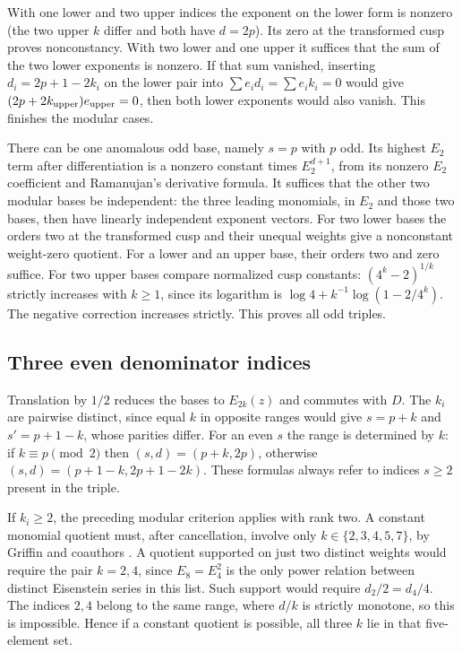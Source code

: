 \documentclass[11pt]{article}
\begin{document}
With one lower and two upper indices the exponent on the lower form is nonzero (the two upper $k$ differ and both have $d=2p$). Its zero at the transformed cusp proves nonconstancy. With two lower and one upper it suffices that the sum of the two lower exponents is nonzero. If that sum vanished, inserting $d_i=2p+1-2k_i$ on the lower pair into $\sum e_i d_i=\sum e_i k_i=0$ would give $(2p+2k_{\rm upper})e_{\rm upper}=0$, then both lower exponents would also vanish. This finishes the modular cases.

There can be one anomalous odd base, namely $s=p$ with $p$ odd. Its highest $E_2$ term after differentiation is a nonzero constant times $E_2^{d+1}$, from its nonzero $E_2$ coefficient and Ramanujan's derivative formula. It suffices that the other two modular bases be independent: the three leading monomials, in $E_2$ and those two bases, then have linearly independent exponent vectors. For two lower bases the orders two at the transformed cusp and their unequal weights give a nonconstant weight-zero quotient. For a lower and an upper base, their orders two and zero suffice. For two upper bases compare normalized cusp constants: $(4^k-2)^{1/k}$ strictly increases with $k\ge1$, since its logarithm is $\log4+k^{-1}\log(1-2/4^k)$. The negative correction increases strictly. This proves all odd triples.

\subsection*{Three even denominator indices}
Translation by $1/2$ reduces the bases to $E_{2k}(z)$ and commutes with $D$. The $k_i$ are pairwise distinct, since equal $k$ in opposite ranges would give $s=p+k$ and $s'=p+1-k$, whose parities differ. For an even $s$ the range is determined by $k$: if $k\equiv p\pmod2$ then $(s,d)=(p+k,2p)$, otherwise $(s,d)=(p+1-k,2p+1-2k)$. These formulas always refer to indices $s\ge2$ present in the triple.

\clearpage
If $k_i\ge2$, the preceding modular criterion applies with rank two. A constant monomial quotient must, after cancellation, involve only $k\in\{2,3,4,5,7\}$, by Griffin and coauthors \cite[Theorem 1.1]{Griffin}. A quotient supported on just two distinct weights would require the pair $k=2,4$, since $E_8=E_4^2$ is the only power relation between distinct Eisenstein series in this list. Such support would require $d_2/2=d_4/4$. The indices $2,4$ belong to the same range, where $d/k$ is strictly monotone, so this is impossible. Hence if a constant quotient is possible, all three $k$ lie in that five-element set.
\end{document}
